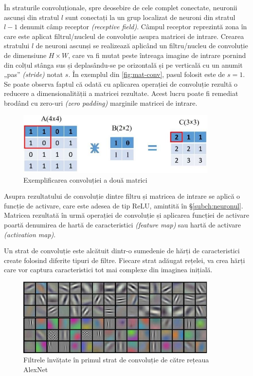 În straturile convoluționale, spre deosebire de cele complet conectate, neuronii ascunși din stratul $l$ sunt conectați la un grup localizat de neuroni din stratul $l-1$ denumit câmp receptor \textit{(receptive field)}. Câmpul receptor reprezintă zona în care este aplicat filtrul/nucleul de convoluție asupra matricei de intrare. Crearea stratului $l$ de neuroni ascunși se realizează aplicând un filtru/nucleu de convoluție de dimensiune $H\times W$, care va fi mutat peste întreaga imagine de intrare pornind din colțul stânga sus și deplasându-se pe orizontală și pe verticală cu un anumit „pas” \textit{(stride)} notat $s$. În exemplul din \autoref{fig:mat-conv}, pasul folosit este de $s=1$. Se poate observa faptul că odată cu aplicarea operației de convoluție rezultă o reducere a dimensionalității a matricei rezultate. Acest lucru poate fi remediat brodând cu zero-uri \textit{(zero padding)} marginile matricei de intrare.
\begin{figure}[ht]
\centering
\includegraphics[width=10cm, keepaspectratio]{fig/cap2/conv-op.jpg}
\caption{Exemplificarea convoluției a două matrici \cite{vrejoiu:2019}}
\label{fig:mat-conv}
\end{figure}

Asupra rezultatului de  convoluție dintre filtru și matricea de intrare se aplică o funcție de activare, care este adesea de tip ReLU, amintită în \S\ref{subch:neuronul}. Matricea rezultată în urmă operației de convoluție și aplicarea funcției de activare poartă denumirea de hartă de caracteristici \textit{(feature map)} sau hartă de activare \textit{(activation map)}.

Un strat de convoluție este alcătuit dintr-o sumedenie de hărți de caracteristici create folosind diferite tipuri de filtre. Fiecare strat adăugat rețelei, va crea hărți care vor captura caracteristici tot mai complexe din imaginea inițială.
\begin{figure}[ht]
\centering
\includegraphics[width=10cm, keepaspectratio]{fig/cap2/alexnet-filters.jpg}
\caption{Filtrele învățate în primul strat de convoluție de către rețeaua AlexNet \cite{alexnet:2012}}
\label{fig:alexnet-filters}
\end{figure}

